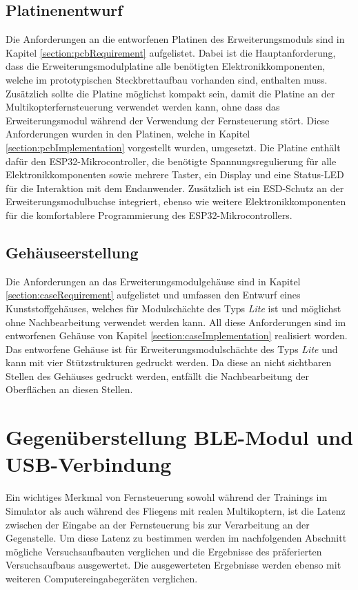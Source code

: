 \subsection{Platinenentwurf}
Die Anforderungen an die entworfenen Platinen des Erweiterungsmoduls sind in Kapitel \ref{section:pcbRequirement} aufgelistet. Dabei ist die Hauptanforderung, dass die Erweiterungsmodulplatine alle benötigten Elektronikkomponenten, welche im prototypischen Steckbrettaufbau vorhanden sind, enthalten muss. Zusätzlich sollte die Platine möglichst kompakt sein, damit die Platine an der Multikopterfernsteuerung verwendet werden kann, ohne dass das Erweiterungsmodul während der Verwendung der Fernsteuerung stört. Diese Anforderungen wurden in den Platinen, welche in Kapitel \ref{section:pcbImplementation} vorgestellt wurden, umgesetzt. Die Platine enthält dafür den ESP32-Mikrocontroller, die benötigte Spannungsregulierung für alle Elektronikkomponenten sowie mehrere Taster, ein Display und eine Status-\ac{LED} für die Interaktion mit dem Endanwender. Zusätzlich ist ein \ac{ESD}-Schutz an der Erweiterungsmodulbuchse integriert, ebenso wie weitere Elektronikkomponenten für die komfortablere Programmierung des ESP32-Mikrocontrollers.

\subsection{Gehäuseerstellung}
Die Anforderungen an das Erweiterungsmodulgehäuse sind in Kapitel \ref{section:caseRequirement} aufgelistet und umfassen den Entwurf eines Kunststoffgehäuses, welches für Modulschächte des Typs \textit{Lite} ist und möglichst ohne Nachbearbeitung verwendet werden kann. All diese Anforderungen sind im entworfenen Gehäuse von Kapitel \ref{section:caseImplementation} realisiert worden. Das entworfene Gehäuse ist für Erweiterungsmodulschächte des Typs \textit{Lite} und kann mit vier Stützstrukturen gedruckt werden. Da diese an nicht sichtbaren Stellen des Gehäuses gedruckt werden, entfällt die Nachbearbeitung der Oberflächen an diesen Stellen.

\section{Gegenüberstellung \acs{BLE}-Modul und USB-Verbindung}
Ein wichtiges Merkmal von Fernsteuerung sowohl während der Trainings im Simulator als auch während des Fliegens mit realen Multikoptern, ist die Latenz zwischen der Eingabe an der Fernsteuerung bis zur Verarbeitung an der Gegenstelle. Um diese Latenz zu bestimmen werden im nachfolgenden Abschnitt mögliche Versuchsaufbauten verglichen und  die Ergebnisse des präferierten Versuchsaufbaus ausgewertet. Die ausgewerteten Ergebnisse werden ebenso mit weiteren Computereingabegeräten verglichen.

